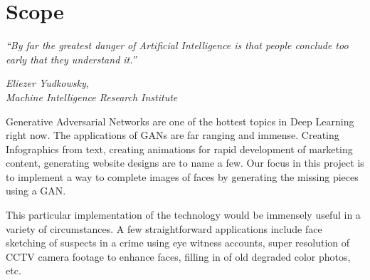 {\chapter{Scope}\label{ch:scope}}
\epigraph{\textit{\Large “By far the greatest danger of Artificial Intelligence is that people conclude too early that they understand it.”}}{\textit{ \large Eliezer Yudkowsky,\\ Machine Intelligence Research Institute}}
Generative Adversarial Networks are one of the hottest topics in Deep Learning right now. The applications of GANs are far ranging and immense. Creating Infographics from text, creating animations for rapid development of marketing content, generating website designs are to name a few. Our focus in this project is to implement a way to complete images of faces by generating the missing pieces using a GAN. 

\par\bigskip
This particular implementation of the technology would be immensely useful in a variety of circumstances. A few straightforward applications include face sketching of suspects in a crime using eye witness accounts, super resolution of CCTV camera footage to enhance faces, filling in of old degraded color photos, etc.